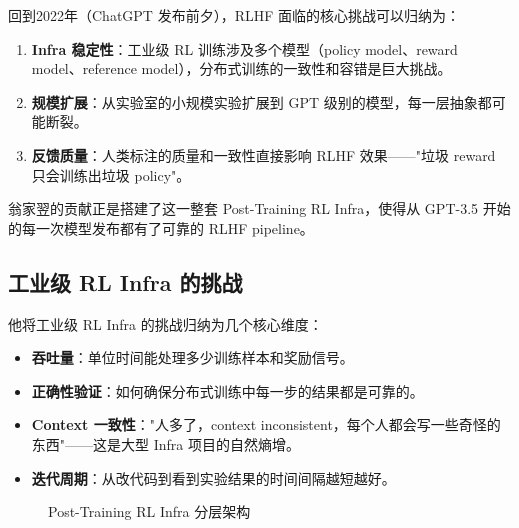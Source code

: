 \documentclass[a4paper]{article}
\begin{document}
回到2022年（ChatGPT 发布前夕），RLHF 面临的核心挑战可以归纳为：

\begin{enumerate}
\item \textbf{Infra 稳定性}：工业级 RL 训练涉及多个模型（policy model、reward model、reference model），分布式训练的一致性和容错是巨大挑战。
\item \textbf{规模扩展}：从实验室的小规模实验扩展到 GPT 级别的模型，每一层抽象都可能断裂。
\item \textbf{反馈质量}：人类标注的质量和一致性直接影响 RLHF 效果——"垃圾 reward 只会训练出垃圾 policy"。
\end{enumerate}

翁家翌的贡献正是搭建了这一整套 Post-Training RL Infra，使得从 GPT-3.5 开始的每一次模型发布都有了可靠的 RLHF pipeline。

\subsection{工业级 RL Infra 的挑战}

他将工业级 RL Infra 的挑战归纳为几个核心维度：

\begin{itemize}
\item \textbf{吞吐量}：单位时间能处理多少训练样本和奖励信号。
\item \textbf{正确性验证}：如何确保分布式训练中每一步的结果都是可靠的。
\item \textbf{Context 一致性}："人多了，context inconsistent，每个人都会写一些奇怪的东西"——这是大型 Infra 项目的自然熵增。
\item \textbf{迭代周期}：从改代码到看到实验结果的时间间隔越短越好。
\end{itemize}

\begin{figure}[H]
\centering
{}
\caption{Post-Training RL Infra 分层架构}
\end{figure}
\end{document}
